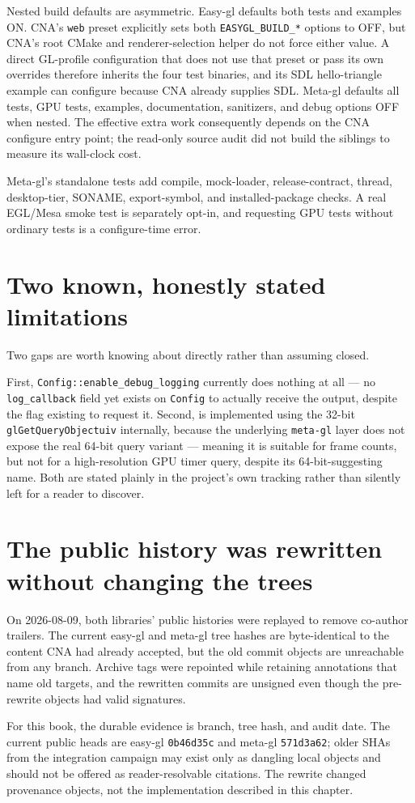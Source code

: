 Nested build defaults are asymmetric. Easy-gl defaults both tests and examples ON. CNA's
\texttt{web} preset explicitly sets both \texttt{EASYGL\_BUILD\_*} options to OFF, but CNA's
root CMake and renderer-selection helper do not force either value. A direct GL-profile
configuration that does not use that preset or pass its own overrides therefore inherits the
four test binaries, and its SDL hello-triangle example can configure because CNA already supplies
SDL. Meta-gl defaults all tests, GPU tests, examples, documentation, sanitizers, and debug
options OFF when nested. The effective extra work consequently depends on the CNA configure
entry point; the read-only source audit did not build the siblings to measure its wall-clock cost.

Meta-gl's standalone tests add compile, mock-loader, release-contract, thread, desktop-tier,
SONAME, export-symbol, and installed-package checks. A real EGL/Mesa smoke test is separately
opt-in, and requesting GPU tests without ordinary tests is a configure-time error.

\section{Two known, honestly stated limitations}

Two gaps are worth knowing about directly rather than assuming closed.

First, \texttt{Config::enable\_debug\_logging} currently does nothing at all --- no
\texttt{log\_callback} field yet exists on \texttt{Config} to actually receive the output,
despite the flag existing to request it. Second,  is
implemented using the 32-bit \texttt{glGetQueryObjectuiv} internally, because the underlying
\texttt{meta-gl} layer does not expose the real 64-bit query variant --- meaning it is
suitable for frame counts, but not for a high-resolution GPU timer query, despite its
64-bit-suggesting name. Both are stated plainly in the project's own tracking rather than
silently left for a reader to discover.

\section{The public history was rewritten without changing the trees}

On 2026-08-09, both libraries' public histories were replayed to remove co-author trailers.
The current easy-gl and meta-gl tree hashes are byte-identical to the content CNA had already
accepted, but the old commit objects are unreachable from any branch. Archive tags were
repointed while retaining annotations that name old targets, and the rewritten commits are
unsigned even though the pre-rewrite objects had valid signatures.

For this book, the durable evidence is branch, tree hash, and audit date. The current public
heads are easy-gl \texttt{0b46d35c} and meta-gl \texttt{571d3a62}; older SHAs from the
integration campaign may exist only as dangling local objects and should not be offered as
reader-resolvable citations. The rewrite changed provenance objects, not the implementation
described in this chapter.
